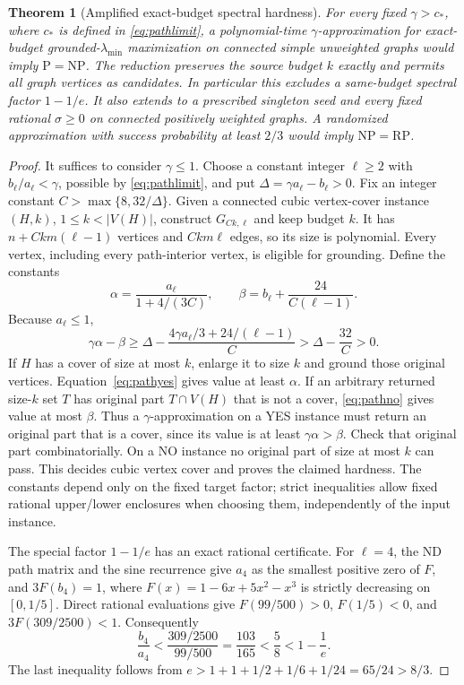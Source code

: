 \documentclass[11pt]{article}
\newtheorem{theorem}{Theorem}
\begin{document}
\begin{theorem}[Amplified exact-budget spectral hardness]
\label{thm:amplifiedhardness}
For every fixed $\gamma>c_*$, where $c_*$ is defined in
\eqref{eq:pathlimit}, a polynomial-time $\gamma$-approximation
for exact-budget grounded-$\lambda_{\min}$ maximization on connected
simple unweighted graphs would imply $\mathrm P=\mathrm{NP}$.
The reduction preserves the source budget $k$ exactly and permits
all graph vertices as candidates. In particular this excludes a
same-budget spectral factor $1-1/e$. It also extends to a prescribed
singleton seed and every fixed rational $\sigma\geq0$ on connected
positively weighted graphs. A randomized approximation with success
probability at least $2/3$ would imply $\mathrm{NP}=\mathrm{RP}$.
\end{theorem}
\begin{proof}
It suffices to consider $\gamma\leq1$. Choose a constant integer
$\ell\geq2$ with $b_\ell/a_\ell<\gamma$, possible by
\eqref{eq:pathlimit}, and put $\Delta=\gamma a_\ell-b_\ell>0$.
Fix an integer constant $C>\max\{8,32/\Delta\}$.
Given a connected cubic vertex-cover instance $(H,k)$,
$1\leq k<|V(H)|$, construct $G_{Ck,\ell}$ and keep budget $k$.
It has $n+Ckm(\ell-1)$ vertices and $Ckm\ell$ edges, so its size
is polynomial. Every vertex, including every path-interior vertex,
is eligible for grounding. Define the constants
\[
 \alpha=\frac{a_\ell}{1+4/(3C)},\qquad
 \beta=b_\ell+\frac{24}{C(\ell-1)}.
\]
Because $a_\ell\leq1$,
\[
 \gamma\alpha-\beta
 \geq\Delta-\frac{4\gamma a_\ell/3+24/(\ell-1)}C
 >\Delta-\frac{32}C>0.
\]
If $H$ has a cover of size at most $k$, enlarge it to size $k$
and ground those original vertices. Equation~\eqref{eq:pathyes}
gives value at least $\alpha$. If an arbitrary returned size-$k$
set $T$ has original part $T\cap V(H)$ that is not a cover,
\eqref{eq:pathno} gives value at most $\beta$.
Thus a $\gamma$-approximation on a YES instance must return an
original part that is a cover, since its value is at least
$\gamma\alpha>\beta$. Check that original part combinatorially.
On a NO instance no original part of size at most $k$ can pass.
This decides cubic vertex cover and proves the claimed hardness.
The constants depend only on the fixed target factor; strict
inequalities allow fixed rational upper/lower enclosures when
choosing them, independently of the input instance.

The special factor $1-1/e$ has an exact rational certificate.
For $\ell=4$, the ND path matrix and the sine recurrence give
$a_4$ as the smallest positive zero of $F$, and $3F(b_4)=1$, where
$F(x)=1-6x+5x^2-x^3$ is strictly decreasing on $[0,1/5]$.
Direct rational evaluations give
$F(99/500)>0$, $F(1/5)<0$, and $3F(309/2500)<1$.
Consequently
\[
 \frac{b_4}{a_4}<\frac{309/2500}{99/500}
 =\frac{103}{165}<\frac58<1-\frac1e.
\]
The last inequality follows from
$e>1+1+1/2+1/6+1/24=65/24>8/3$.


\end{proof}
\end{document}
